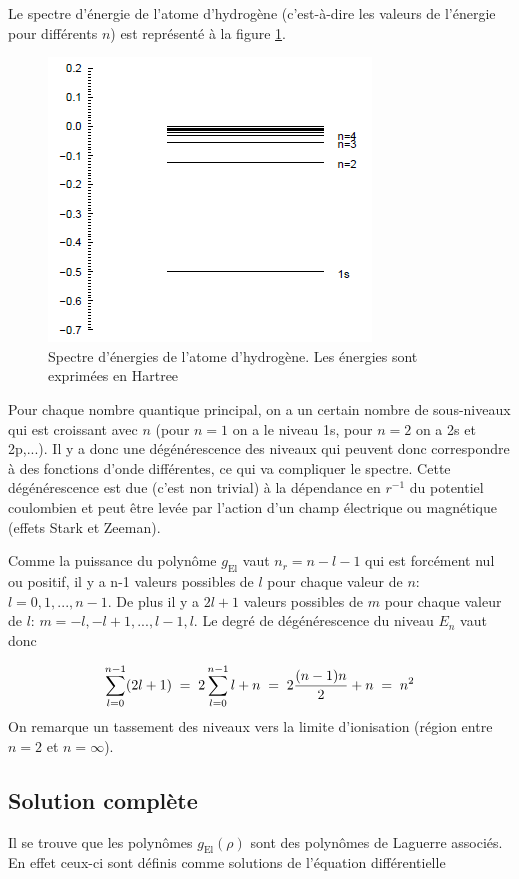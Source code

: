 Le spectre d'énergie de l'atome d'hydrogène (c'est-à-dire les valeurs de l'énergie pour différents $n$) est représenté à la figure \ref{fig:spectreH}. 
\begin{figure}[tph]
    \centering
    \includegraphics{Images2/spectreH.PNG}
    \caption{Spectre d'énergies de l'atome d'hydrogène. Les énergies sont exprimées en Hartree}
    \label{fig:spectreH}
\end{figure}
Pour chaque nombre quantique principal, on a un certain nombre de sous-niveaux qui est croissant avec $n$ (pour $n=1$ on a le niveau 1s, pour $n=2$ on a 2s et 2p,...). Il y a donc une dégénérescence des niveaux qui peuvent donc correspondre à des fonctions d'onde différentes, ce qui va compliquer le spectre. Cette dégénérescence est due (c'est non trivial) à la dépendance en $r^{-1}$ du potentiel coulombien et peut être levée par l'action d'un champ électrique ou magnétique (effets Stark et Zeeman).

Comme la puissance du polynôme $g_\text{El}$ vaut $n_r=n-l-1$ qui est forcément nul ou positif, il y a n-1 valeurs possibles de $l$ pour chaque valeur de $n$: $l=0, 1, ..., n-1$. De plus il y a $2l+1$ valeurs possibles de $m$ pour chaque valeur de $l$: $m=-l, -l+1, ..., l-1, l$. Le degré de dégénérescence du niveau $E_n$ vaut donc

\[
    \sum_{l=0}^{n-1} (2l+1)\; = \; 2\sum_{l=0}^{n-1} l + n \; = \;  2 \dfrac{(n-1)n}{2} + n \; = \;  n^2
\]
On remarque un tassement des niveaux vers la limite d'ionisation (région entre $n=2$ et $n=\infty$).

\subsection{Solution complète}
Il se trouve que les polynômes $g_\text{El}(\rho)$ sont des polynômes de Laguerre associés. En effet ceux-ci sont définis comme solutions de l'équation différentielle

